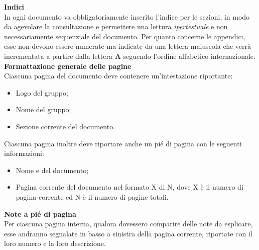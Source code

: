   \textbf{Indici} \\
  In ogni documento va obbligatoriamente inserito l'indice per le sezioni, in modo da agevolare la consultazione e permettere una lettura \textit{ipertestuale} 
  e non necessariamente sequenziale del documento.
  Per quanto concerne le appendici, esse non devono essere numerate ma indicate da una lettera maiuscola che verrà
  incrementata a partire dalla lettera \textbf{A} seguendo l’ordine alfabetico internazionale. \\
  
  \textbf{Formattazione generale delle pagine}  \\
  Ciascuna pagina del documento deve contenere un'intestazione riportante:
  \begin{itemize}
  \item Logo del gruppo;
  \item Nome del gruppo;
  \item Sezione corrente del documento.
  \end{itemize}
  Ciascuna pagina inoltre deve riportare anche un pié di pagina con le seguenti informazioni:
  \begin{itemize}
  \item Nome e  del documento;
  \item Pagina corrente del documento nel formato X di N, dove X è il numero di pagina corrente ed N è il numero di pagine totali.
  \end{itemize}
  
  \textbf{Note a pié di pagina} \\
  Per ciascuna pagina interna, qualora dovessero comparire delle note da esplicare, esse andranno segnalate in
  basso a sinistra della pagina corrente, riportate con il loro numero e la loro descrizione.
	

